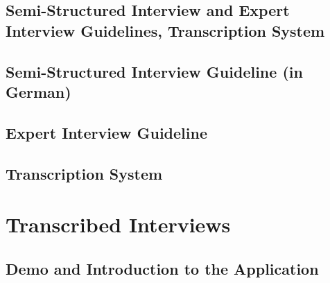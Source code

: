 \clearpage
\newpage
\setcounter{page}{1}
\onecolumn

\setcounter{section}{0}
\setcounter{subsection}{0}
\renewcommand{\theHsection}{Appendix \Alph{section}}
\renewcommand{\thesection}{Appendix \Alph{section}}
\renewcommand{\theHsubsection}{Appendix \Alph{section}.\arabic{subsection}}
\renewcommand{\thesubsection}{Appendix \Alph{section}.\arabic{subsection}}

\begin{landscape}

\section{Semi-Structured Interview and Expert Interview Guidelines, Transcription System}

\subsection{Semi-Structured Interview Guideline (in German)}
\label{appendix:semi-structured}
  

\end{landscape}
\newpage

\twocolumn

\nobalance

\subsection{Expert Interview Guideline}
\label{appendix:expert}
  
  
\subsection{Transcription System}
\label{appendix:transcription}
  


\section{Transcribed Interviews}
\label{appendix:interviews}

\subsection{Demo and Introduction to the Application}
\label{appendix:demo}
  
  
